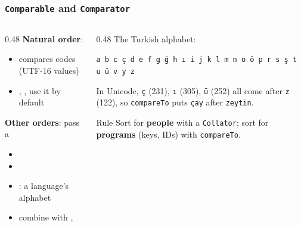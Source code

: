 \documentclass[aspectratio=169,10pt,compress]{beamer}
\begin{document}
\begin{frame}[t,fragile] \frametitle{\texttt{Comparable} and \texttt{Comparator}}
  \begin{columns}[T]
    \begin{column}{0.48\textwidth}
      \textbf{Natural order}: 
      
      \begin{itemize}\small
        
        \item {} compares  codes (UTF-16 values)
        
        \item {}, ,  use it by default
      \end{itemize}
      
      \textbf{Other orders}: pass a 
      
      \begin{itemize}\small
        
        \item {}
        
        \item {}
        
        \item {}: a language's alphabet
        
        \item combine with , 
      \end{itemize}
    \end{column}
    \begin{column}{0.48\textwidth}
      \small The Turkish alphabet:

      \vspace{0.3em}
      \texttt{a b c ç d e f g ğ h ı i j k l m n o ö p r s ş t u ü v y z}

      \vspace{0.5em}
      In Unicode, \texttt{ç} (231), \texttt{ı} (305), \texttt{ü} (252) all come after \texttt{z} (122),
      so \texttt{compareTo} puts \texttt{çay} after \texttt{zeytin}.
      \begin{alertblock}{Rule}
        \small Sort for \textbf{people} with a \texttt{Collator};
        sort for \textbf{programs} (keys, IDs) with \texttt{compareTo}.
      \end{alertblock}
    \end{column}
  \end{columns}
\end{frame}
\end{document}
